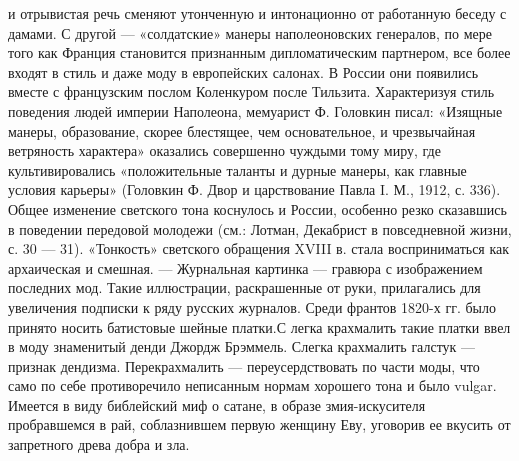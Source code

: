 и отрывистая речь сменяют утонченную и интонационно от работанную беседу с дамами. 
С другой — «солдатские» манеры наполеоновских генералов, по мере того как 
Франция становится признанным дипломатическим партнером, все более входят в стиль и даже моду 
в европейских салонах.
В России они появились вместе с французским послом Коленкуром после Тильзита. 
Характеризуя стиль поведения людей империи Наполеона, мемуарист Ф. Головкин писал: «Изящные манеры, образование, скорее блестящее, чем основательное, и чрезвычайная ветряность характера» оказались совершенно чуждыми тому миру, где культивировались 
«положительные таланты и дурные манеры, как главные условия карьеры»
(Головкин Ф. Двор и царствование Павла I. М., 1912, с. 336). Общее изменение светского тона коснулось и России, 
особенно резко сказавшись в поведении передовой молодежи (см.: Лотман, Декабрист в повседневной жизни, с. 30 — 31). «Тонкость» светского обращения XVIII в. стала восприниматься как архаическая и смешная. 
\label{giornale}
— Журнальная картинка — гравюра с изображением последних мод. 
Такие иллюстрации, раскрашенные от руки, прилагались для увеличения подписки к ряду русских 
журналов. 
\label{cravatta}
Среди франтов 1820-х гг. было принято носить батистовые шейные платки.С
легка крахмалить такие платки ввел в моду знаменитый денди Джордж Брэммель.   
Слегка крахмалить галстук — признак дендизма. 
Перекрахмалить — переусердствовать по части моды, что само по себе 
противоречило неписанным нормам хорошего тона и было vulgar.
\label{eva}
Имеется в виду библейский миф о сатане, в образе змия-искусителя пробравшемся 
в рай, соблазнившем первую женщину Еву, уговорив ее вкусить от запретного древа добра и зла. 